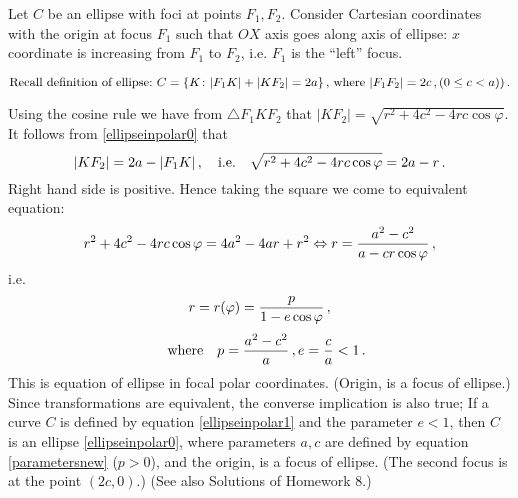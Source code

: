 \documentclass[12pt]{article}
\numberwithin{equation}{section}
\begin{document}
  Let $C$ be an ellipse with foci at points $F_1,F_2$.
Consider Cartesian coordinates with the origin at focus
$F_1$ 
 such that $OX$ axis goes along axis of ellipse:
$x$ coordinate is increasing from $F_1$ to $F_2$,
i.e. $F_1$ is the ``left''  focus.

 \begin{equation}\label{ellipseinpolar0}
\hbox {Recall definition of ellipse:}\,\,
   C=\{K\colon |F_1K|+|KF_2|=2a\}\,,\,
{\rm where}\,\,|F_1F_2|=2c\,, (0\leq c<a))\,. 
     \end{equation}
\smallskip

Using the cosine  rule we have from $\triangle F_1KF_2$ that
$|KF_2|=\sqrt{r^2+4c^2-4rc\cos\varphi}$.
 It follows from \eqref{ellipseinpolar0}
that
                 $$
  |KF_2|=2a-|F_1K|\,,\quad {\rm i.e.}\quad
 \sqrt{r^2+4c^2-4rc\cos\varphi}=2a-r\,.
                 $$
Right hand side is positive. Hence
taking the square we come to equivalent equation:
           $$
r^2+4c^2-4rc\cos\varphi=4a^2-4ar+r^2
  \Leftrightarrow
 r={a^2-c^2\over a-cr\cos\varphi}\,,
            $$
i.e.
             \begin{equation}\label{ellipseinpolar1}
 r=r(\varphi)=
{p\over 1-e\cos\varphi}\,, 
           \end{equation}
        \begin{equation}\label{parametersnew}
\quad {\rm where}\quad p={a^2-c^2\over a}\,,
           e={c\over a}<1\,.
               \end{equation}
This is equation of ellipse in focal polar coordinates.
(Origin, is a  focus of ellipse.)   Since transformations
are equivalent, the converse implication is also true;
If a curve $C$ is defined by equation 
\eqref{ellipseinpolar1} and the parameter 
$e<1$, then $C$ is an
ellipse  \eqref{ellipseinpolar0}, where parameters $a,c$
are defined by equation \eqref{parametersnew} ($p>0$),
and the origin, is a focus of ellipse.
(The second focus is at the point $(2c,0)$.)
(See also Solutions of Homework 8.)
\end{document}
